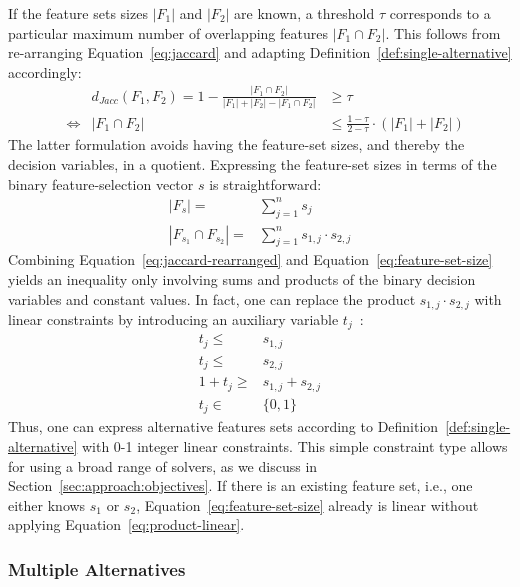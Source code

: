 \documentclass{article}
\theoremstyle{definition}
\begin{document}
If the feature sets sizes $|F_1|$ and $|F_2|$ are known, a threshold $\tau$ corresponds to a particular maximum number of overlapping features $|F_1 \cap F_2|$.
This follows from re-arranging Equation~\ref{eq:jaccard} and adapting Definition~\ref{def:single-alternative} accordingly:
%
\begin{align}
	& & d_{Jacc}(F_1,F_2) = 1 - \frac{|F_1 \cap F_2|}{|F_1| + |F_2| - |F_1 \cap F_2|} &\geq \tau \nonumber \\
	&\Leftrightarrow & |F_1 \cap F_2| &\leq \frac{1 - \tau}{2 - \tau} \cdot (|F_1| + |F_2|)
	\label{eq:jaccard-rearranged}
\end{align}
%
The latter formulation avoids having the feature-set sizes, and thereby the decision variables, in a quotient.
Expressing the feature-set sizes in terms of the binary feature-selection vector $s$ is straightforward:
%
\begin{align}
	|F_s| =& \sum_{j=1}^n s_j \nonumber \\
	|F_{s_1} \cap F_{s_2}| =& \sum_{j=1}^n s_{1,j} \cdot s_{2,j}
	\label{eq:feature-set-size}
\end{align}
%
Combining Equation~\ref{eq:jaccard-rearranged} and Equation~\ref{eq:feature-set-size} yields an inequality only involving sums and products of the binary decision variables and constant values.
In fact, one can replace the product $s_{1,j} \cdot s_{2,j}$ with linear constraints by introducing an auxiliary variable $t_j$~\cite{mosek2021modeling}:
%
\begin{align}
	t_j \leq& s_{1,j} \nonumber \\
	t_j \leq& s_{2,j} \nonumber \\
	1 + t_j \geq& s_{1,j} + s_{2,j} \nonumber \\
	t_j \in& \{0,1\}
	\label{eq:product-linear}
\end{align}
%
Thus, one can express alternative features sets according to Definition~\ref{def:single-alternative} with 0-1 integer linear constraints.
This simple constraint type allows for using a broad range of solvers, as we discuss in Section~\ref{sec:approach:objectives}.
If there is an existing feature set, i.e., one either knows $s_1$ or $s_2$, Equation~\ref{eq:feature-set-size} already is linear without applying Equation~\ref{eq:product-linear}.

\subsubsection{Multiple Alternatives}
\label{sec:approach:constraints:multiple}
\end{document}
